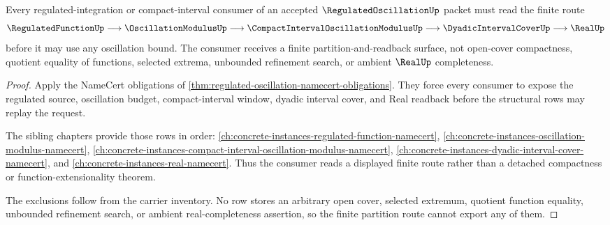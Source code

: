 \begin{theorem}
\label{thm:regulated-oscillation-finite-partition-nonescape}
Every regulated-integration or compact-interval consumer of an accepted $\RegulatedOscillationUp$ packet must read the finite route
$$
\RegulatedFunctionUp \longrightarrow \OscillationModulusUp \longrightarrow \CompactIntervalOscillationModulusUp \longrightarrow \DyadicIntervalCoverUp \longrightarrow \RealUp
$$
before it may use any oscillation bound. The consumer receives a finite partition-and-readback surface, not open-cover compactness, quotient equality of functions, selected extrema, unbounded refinement search, or ambient $\RealUp$ completeness.
\end{theorem}
\begin{proof}
Apply the NameCert obligations of \autoref{thm:regulated-oscillation-namecert-obligations}. They force every consumer to expose the regulated source, oscillation budget, compact-interval window, dyadic interval cover, and Real readback before the structural rows may replay the request.

The sibling chapters provide those rows in order: \autoref{ch:concrete-instances-regulated-function-namecert}, \autoref{ch:concrete-instances-oscillation-modulus-namecert}, \autoref{ch:concrete-instances-compact-interval-oscillation-modulus-namecert}, \autoref{ch:concrete-instances-dyadic-interval-cover-namecert}, and \autoref{ch:concrete-instances-real-namecert}. Thus the consumer reads a displayed finite route rather than a detached compactness or function-extensionality theorem.

The exclusions follow from the carrier inventory. No row stores an arbitrary open cover, selected extremum, quotient function equality, unbounded refinement search, or ambient real-completeness assertion, so the finite partition route cannot export any of them.
\end{proof}



